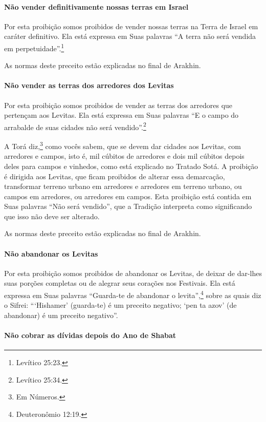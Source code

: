 \paragraph{Não vender definitivamente nossas terras em Israel}

Por esta proibição somos proibidos de vender nossas terras na Terra de
Israel em caráter definitivo. Ela está expressa em Suas palavras ``A
terra não será vendida em perpetuidade''.\footnote{Levítico 25:23.}

As normas deste preceito estão explicadas no final de Arakhin.

\paragraph{Não vender as terras dos arredores dos Levitas}

Por esta proibição somos proibidos de vender as terras dos arredores
que pertençam aos Levitas. Ela está expressa em Suas palavras ``E o
campo do arrabalde de suas cidades não será vendido''.\footnote{Levítico 25:34.}

A Torá diz,\footnote{Em Números.} como vocês sabem, que se devem dar
cidades aos Levitas, com arredores e campos, isto é, mil cúbitos de
arredores e dois mil cúbitos depois deles para campos e vinhedos, como
está explicado no Tratado Sotá. A proibição é dirigida aos Levitas, que
ficam proibidos de alterar essa demarcação, transformar terreno urbano
em arredores e arredores em terreno urbano, ou campos em arredores, ou
arredores em campos. Esta proibição está contida em Suas palavras ``Não
será vendido'', que a Tradição interpreta como significando que isso não
deve ser alterado.

As normas deste preceito estão explicadas no final de Arakhin.

\paragraph{Não abandonar os Levitas}

Por esta proibição somos proibidos de abandonar os Levitas, de deixar
de dar-lhes suas porções completas ou de alegrar seus corações nos
Festivais. Ela está expressa em Suas palavras ``Guarda-te de abandonar
o levita'',\footnote{Deuteronômio 12:19.} sobre as quais diz o Sifrei:
```Hishamer' (guarda-te) é um preceito negativo; `pen ta azov' (de
abandonar) é um preceito negativo''.

\paragraph{Não cobrar as dívidas depois do Ano de Shabat}


